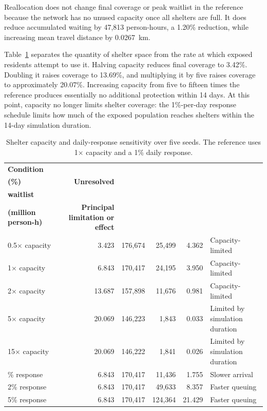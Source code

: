 Reallocation does not change final coverage or peak waitlist in the reference because the network has no unused capacity once all shelters are full. It does reduce accumulated waiting by 47,813 person-hours, a 1.20\% reduction, while increasing mean travel distance by 0.0267~km.

Table~\ref{tbl:shelter_capacity_response} separates the quantity of shelter space from the rate at which exposed residents attempt to use it. Halving capacity reduces final coverage to 3.42\%. Doubling it raises coverage to 13.69\%, and multiplying it by five raises coverage to approximately 20.07\%. Increasing capacity from five to fifteen times the reference produces essentially no additional protection within 14 days. At this point, capacity no longer limits shelter coverage: the 1\%-per-day response schedule limits how much of the exposed population reaches shelters within the 14-day simulation duration.

\begin{table}[ht]
\centering
\footnotesize
\caption{Shelter capacity and daily-response sensitivity over five seeds. The reference uses 1$\times$ capacity and a 1\% daily response.}
\label{tbl:shelter_capacity_response}
\begin{tabularx}{\linewidth}{@{}lrrrrX@{}}
\toprule
\textbf{Condition} &
\shortstack{\textbf{Coverage}\\\textbf{(\%)}} &
\textbf{Unresolved} &
\shortstack{\textbf{Peak}\\\textbf{waitlist}} &
\shortstack{\textbf{Waiting}\\\textbf{(million person-h)}} &
\textbf{Principal limitation or effect} \\
\midrule
0.5$\times$ capacity & 3.423 & 176,674 & 25,499 & 4.362 & Capacity-limited \\
1$\times$ capacity  & 6.843 & 170,417 & 24,195 & 3.950 & Capacity-limited \\
2$\times$ capacity  & 13.687 & 157,898 & 11,676 & 0.981 & Capacity-limited \\
5$\times$ capacity  & 20.069 & 146,223 & 1,843 & 0.033 & Limited by simulation duration \\
15$\times$ capacity & 20.069 & 146,222 & 1,841 & 0.026 & Limited by simulation duration \\
\addlinespace
0.5\% response & 6.843 & 170,417 & 11,436 & 1.755 & Slower arrival \\
2\% response   & 6.843 & 170,417 & 49,633 & 8.357 & Faster queuing \\
5\% response   & 6.843 & 170,417 & 124,364 & 21.429 & Faster queuing \\
\bottomrule
\end{tabularx}
\end{table}

